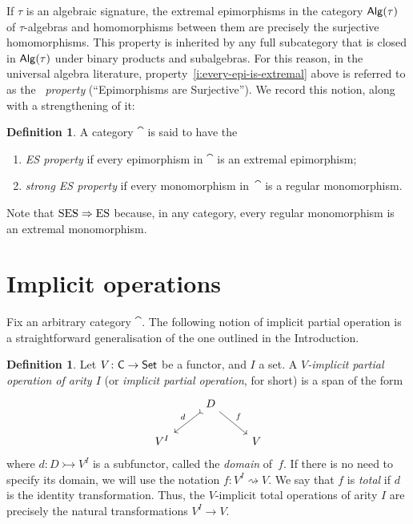 \documentclass[a4paper,10pt,reqno]{amsart}
\theoremstyle{definition}
\newtheorem{definition}[theorem]{Definition}
\theoremstyle{remark}
\begin{document}
If $\tau$ is an algebraic signature, the extremal epimorphisms in the category ${\sf Alg}(\tau)$ of $\tau$-algebras and homomorphisms between them are precisely the surjective homomorphisms. This property is inherited by any full subcategory that is closed in ${\sf Alg}(\tau)$ under binary products and subalgebras.
%
For this reason, in the universal algebra literature, property~\ref{i:every-epi-is-extremal} above is referred to as the \emph{\ES~property} (``Epimorphisms are Surjective'').
%
We record this notion, along with a strengthening of it:

\begin{definition}
A category $\cat$ is said to have the
\begin{enumerate}
\item[(\ES)]\label{ES} \emph{ES property} if every epimorphism in $\cat$ is an extremal epimorphism;
\item[(\SES)]\label{SES} \emph{strong ES property} if every monomorphism in~$\cat$ is a regular monomorphism.
\end{enumerate}
\end{definition}

Note that $\textnormal{SES}\Rightarrow\textnormal{ES}$ because, in any category, every regular monomorphism is an extremal monomorphism.


\section{Implicit operations}\label{s:implicit-operations-defined}

Fix an arbitrary category $\cat$. The following notion of implicit partial operation is a straightforward generalisation of the one outlined in the Introduction.

\begin{definition}
Let $V\colon {\sf C}\to{\sf Set}$ be a functor, and $I$ a set. A \emph{$V$-implicit partial operation of arity $I$} (or \emph{implicit partial operation}, for short) is a span of the form 
\[\begin{tikzcd}
& D \arrow[rightarrowtail]{dl}[swap]{d} \arrow{dr}{f} & \\
V^{I} & & V
\end{tikzcd}\]
where $d\colon D\rightarrowtail V^{I}$ is a subfunctor, called the \emph{domain} of~$f$. If there is no need to specify its domain, we will use the notation $f\colon V^{I} \rightsquigarrow V$. We say that $f$ is \emph{total} if $d$ is the identity transformation. Thus, the $V$-implicit total operations of arity $I$ are precisely the natural transformations $V^{I}\to V$. 
\end{definition}
\end{document}
